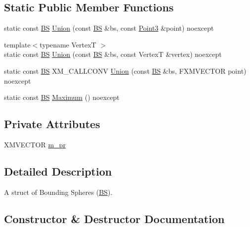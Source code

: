\subsection*{Static Public Member Functions}
\begin{DoxyCompactItemize}
\item 
static const \hyperlink{classmage_1_1_b_s}{BS} \hyperlink{classmage_1_1_b_s_a7b96b2f5aad48af6f59c45e4bbb4a1af}{Union} (const \hyperlink{classmage_1_1_b_s}{BS} \&bs, const \hyperlink{structmage_1_1_point3}{Point3} \&point) noexcept
\item 
{\footnotesize template$<$typename VertexT $>$ }\\static const \hyperlink{classmage_1_1_b_s}{BS} \hyperlink{classmage_1_1_b_s_a05c2059f08c3e52cba81eb8e66687c7c}{Union} (const \hyperlink{classmage_1_1_b_s}{BS} \&bs, const VertexT \&vertex) noexcept
\item 
static const \hyperlink{classmage_1_1_b_s}{BS} X\+M\+\_\+\+C\+A\+L\+L\+C\+O\+NV \hyperlink{classmage_1_1_b_s_a1b7d3881c27d8c64512b8bc289d2c6f6}{Union} (const \hyperlink{classmage_1_1_b_s}{BS} \&bs, F\+X\+M\+V\+E\+C\+T\+OR point) noexcept
\item 
static const \hyperlink{classmage_1_1_b_s}{BS} \hyperlink{classmage_1_1_b_s_aa27b256cee85ee8688350e93ca4e7f0e}{Maximum} () noexcept
\end{DoxyCompactItemize}
\subsection*{Private Attributes}
\begin{DoxyCompactItemize}
\item 
X\+M\+V\+E\+C\+T\+OR \hyperlink{classmage_1_1_b_s_aebcf385ad6e06a9b8ac4215c614d9d9a}{m\+\_\+pr}
\end{DoxyCompactItemize}


\subsection{Detailed Description}
A struct of Bounding Spheres (\hyperlink{classmage_1_1_b_s}{BS}). 

\subsection{Constructor \& Destructor Documentation}
\hypertarget{classmage_1_1_b_s_a16e3f5e75f0af8f88f5c0fca7101975e}{}\label{classmage_1_1_b_s_a16e3f5e75f0af8f88f5c0fca7101975e} 
